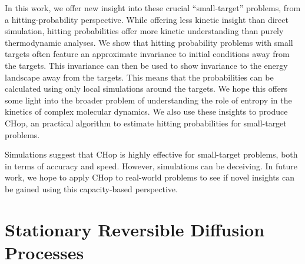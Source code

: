 \documentclass[english, aip, jcp, priprint, graphicx,floatfix]{revtex4-1}
\theoremstyle{plain}
\theoremstyle{definition}
\theoremstyle{plain}
\begin{document}
In this work, we offer new insight into these crucial ``small-target'' problems, from a hitting-probability perspective.  While offering less kinetic insight than direct simulation, hitting probabilities offer more kinetic understanding than purely thermodynamic analyses.  We show that hitting probability problems with small targets often feature an approximate invariance to initial conditions away from the targets.  This invariance can then be used to show invariance to the energy landscape away from the targets.  This means that the probabilities can be calculated using only local simulations around the targets.  We hope this offers some light into the broader problem of understanding the role of entropy in the kinetics of complex molecular dynamics.  We also use these insights to produce CHop, an practical algorithm to estimate hitting probabilities for small-target problems.  

Simulations suggest that CHop is highly effective for small-target problems, both in terms of accuracy and speed.  However, simulations can be deceiving.  In future work, we hope to apply CHop to real-world problems to see if novel insights can be gained using this capacity-based perspective.  

\appendix


\appendix

                                                         


\section{Stationary Reversible Diffusion Processes}\label{sec:reversible_diffusion}
\end{document}
